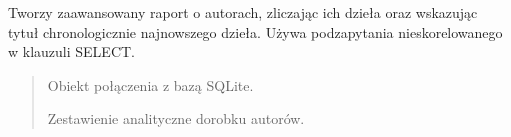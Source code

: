 \documentclass[a4paper,11pt,english,openany,oneside]{sphinxmanual}
\begin{document}
\begin{savenotes}\begin{fulllineitems}
\label{\detokenize{rozdzial_5/index:biblioteka_zapytania.get_raport_autorow}}
\pysigstartsignatures
\pysiglinewithargsret
{}
{}
{}
\pysigstopsignatures
\sphinxAtStartPar
Tworzy zaawansowany raport o autorach, zliczając ich dzieła oraz wskazując tytuł chronologicznie najnowszego dzieła.
Używa podzapytania nieskorelowanego w klauzuli SELECT.

\sphinxAtStartPar
{}

\begin{sphinxVerbatim}[commandchars=\\\{\}]
\end{sphinxVerbatim}
\begin{quote}\begin{description}
\sphinxAtStartPar
{} \textendash{} Obiekt połączenia z bazą SQLite.

\sphinxAtStartPar
Zestawienie analityczne dorobku autorów.

\end{description}\end{quote}

\end{fulllineitems}\end{savenotes}
\end{document}
